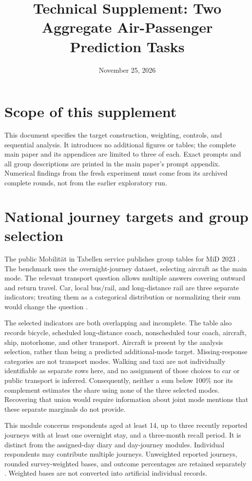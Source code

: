 \documentclass{article}
\title{Technical Supplement: Two Aggregate Air-Passenger Prediction Tasks}
\author{}
\date{November 25, 2026}
\begin{document}
\maketitle

\section{Scope of this supplement}
This document specifies the target construction, weighting, controls, and sequential analysis. It introduces no additional figures or tables; the complete main paper and its appendices are limited to three of each. Exact prompts and all group descriptions are printed in the main paper's prompt appendix. Numerical findings from the fresh experiment must come from its archived complete rounds, not from the earlier exploratory run.

\section{National journey targets and group selection}
The public Mobilit\"at in Tabellen service publishes group tables for MiD 2023 \citep{mit2023}. The benchmark uses the overnight-journey dataset, selecting aircraft as the main mode. The relevant transport question allows multiple answers covering outward and return travel. Car, local bus/rail, and long-distance rail are three separate indicators; treating them as a categorical distribution or normalizing their sum would change the question \citep{midquestionnaire2025}.

The selected indicators are both overlapping and incomplete. The table also records bicycle, scheduled long-distance coach, nonscheduled tour coach, aircraft, ship, motorhome, and other transport. Aircraft is present by the analysis selection, rather than being a predicted additional-mode target. Missing-response categories are not transport modes. Walking and taxi are not individually identifiable as separate rows here, and no assignment of those choices to car or public transport is inferred. Consequently, neither a sum below 100\% nor its complement estimates the share using none of the three selected modes. Recovering that union would require information about joint mode mentions that these separate marginals do not provide.

This module concerns respondents aged at least 14, up to three recently reported journeys with at least one overnight stay, and a three-month recall period. It is distinct from the assigned-day diary and day-journey modules. Individual respondents may contribute multiple journeys. Unweighted reported journeys, rounded survey-weighted bases, and outcome percentages are retained separately \citep{midmethods2025,midhandbook2025}. Weighted bases are not converted into artificial individual records.
\end{document}
